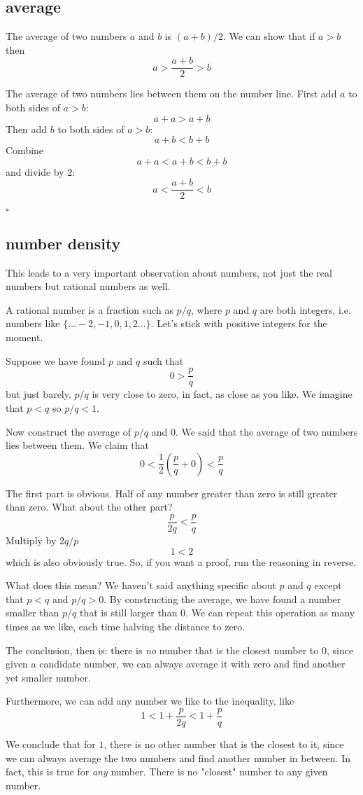\documentclass[11pt, oneside]{article}
\begin{document}
\subsection*{average}
The average of two numbers $a$ and $b$ is $(a + b)/2$.  We can show that if $a > b$ then
\[ a > \frac{a + b}{2} > b \]

The average of two numbers lies between them on the number line.  First add $a$ to both sides of $a > b$:
\[ a + a > a + b \]
Then add $b$ to both sides of $a > b$:
\[ a + b < b + b \]
Combine
\[ a + a < a + b < b + b \]
and divide by $2$:
\[ a < \frac{a + b}{2} < b \]

$\square$

\subsection*{number density}

This leads to a very important observation about numbers, not just the real numbers but rational numbers as well.  

A rational number is a fraction such as $p/q$, where $p$ and $q$ are both integers, i.e. numbers like $\{\dots -2 , -1, 0, 1, 2 \dots \}$.  Let's stick with positive integers for the moment.

Suppose we have found $p$ and $q$ such that 
\[ 0 > \frac{p}{q} \]
but just barely.  $p/q$ is very close to zero, in fact, as close as you like.  We imagine that $p < q$ so $p/q < 1$.

Now construct the average of $p/q$ and $0$.  We said that the average of two numbers lies between them.  We claim that
\[ 0 < \frac{1}{2} (\frac{p}{q} + 0) < \frac{p}{q} \]

The first part is obvious.  Half of any number greater than zero is still greater than zero.  What about the other part?
\[ \frac{p}{2q} < \frac{p}{q} \]
Multiply by $2q/p$
\[ 1 < 2 \]
which is also obviously true.  So, if you want a proof, run the reasoning in reverse.

What does this mean?  We haven't said anything specific about $p$ and $q$ except that $p < q$ and $p/q > 0$.  By constructing the average, we have found a number smaller than $p/q$ that is still larger than $0$.  We can repeat this operation as many times as we like, each time halving the distance to zero.

The conclusion, then is:  there is \emph{no} number that is the closest number to $0$, since given a candidate number, we can always average it with zero and find another yet smaller number.

Furthermore, we can add any number we like to the inequality, like
\[ 1 < 1 + \frac{p}{2q} < 1 + \frac{p}{q} \]

We conclude that for $1$, there is no other number that is the closest to it, since we can always average the two numbers and find another number in between.  In fact, this is true for \emph{any} number.  There is no "closest" number to any given number.
\end{document}
